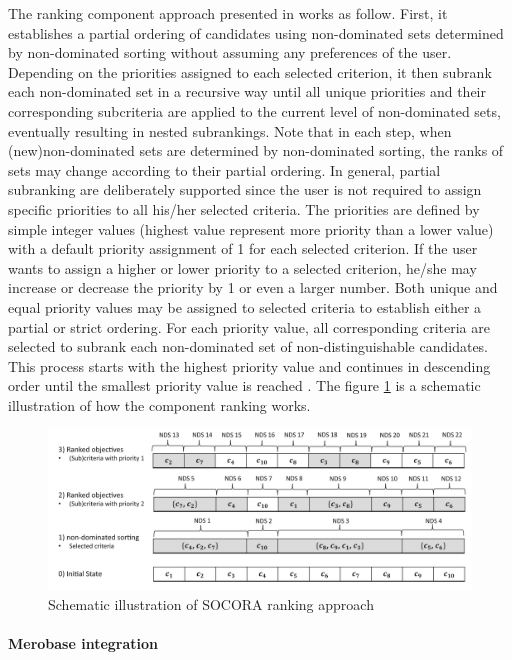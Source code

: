 The ranking component approach presented in \cite{Kessel2016} works as follow. First, it establishes a partial ordering of candidates using non-dominated sets determined by non-dominated sorting without assuming any preferences of the user. Depending on the priorities assigned to each selected criterion, it then subrank each non-dominated set in a recursive way until all unique priorities and their corresponding subcriteria are applied to the current level of non-dominated sets, eventually resulting in nested subrankings. Note that in each step, when (new)non-dominated sets are determined by non-dominated sorting, the ranks of sets may change according to their partial ordering. In general, partial subranking are deliberately supported since the user is not required to assign specific priorities to all his/her selected criteria. The priorities are defined by simple integer values (highest value represent more priority than a lower value) with a default priority assignment of 1 for each selected criterion. If the user wants to assign a higher or lower priority to a selected criterion, he/she may increase or decrease the priority by 1 or even a larger number. Both unique and equal priority values may be assigned to selected criteria to establish either a partial or strict ordering. For each priority value, all corresponding criteria are selected to subrank each non-dominated set of non-distinguishable candidates. This process starts with the highest priority value and continues in descending order until the smallest priority value is reached \citep{Kessel2016}. The figure \ref{fig:socora-ex} is a schematic illustration of how the component ranking works.

\begin{figure}[ht]
	\centering
    \includegraphics[width=\textwidth]{grafiken/socoraExample}
    \caption{Schematic illustration of SOCORA ranking approach \citep{Kessel2016}}
    \label{fig:socora-ex}
\end{figure}

\paragraph{Merobase integration}

